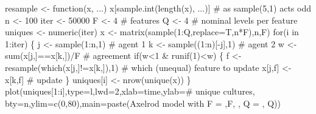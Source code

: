 \documentclass[
  a4paper,
  DIV=11,
  numbers=noendperiod]{scrreprt}
\newenvironment{Shaded}{\begin{snugshade}}{\end{snugshade}}
\newcommand{\AttributeTok}[1]{\textcolor[rgb]{0.40,0.45,0.13}{#1}}
\newcommand{\CommentTok}[1]{\textcolor[rgb]{0.37,0.37,0.37}{#1}}
\newcommand{\ControlFlowTok}[1]{\textcolor[rgb]{0.00,0.23,0.31}{#1}}
\newcommand{\DecValTok}[1]{\textcolor[rgb]{0.68,0.00,0.00}{#1}}
\newcommand{\FunctionTok}[1]{\textcolor[rgb]{0.28,0.35,0.67}{#1}}
\newcommand{\NormalTok}[1]{\textcolor[rgb]{0.00,0.23,0.31}{#1}}
\newcommand{\OtherTok}[1]{\textcolor[rgb]{0.00,0.23,0.31}{#1}}
\newcommand{\SpecialCharTok}[1]{\textcolor[rgb]{0.37,0.37,0.37}{#1}}
\newcommand{\StringTok}[1]{\textcolor[rgb]{0.13,0.47,0.30}{#1}}
\begin{document}
\begin{Shaded}
\begin{Highlighting}[]
\NormalTok{resample }\OtherTok{\textless{}{-}} \ControlFlowTok{function}\NormalTok{(x, ...) x[}\FunctionTok{sample.int}\NormalTok{(}\FunctionTok{length}\NormalTok{(x), ...)] }\CommentTok{\# as sample(5,1) acts odd}
\NormalTok{n }\OtherTok{\textless{}{-}} \DecValTok{100}
\NormalTok{iter }\OtherTok{\textless{}{-}} \DecValTok{50000}
\NormalTok{F }\OtherTok{\textless{}{-}} \DecValTok{4} \CommentTok{\# features}
\NormalTok{Q }\OtherTok{\textless{}{-}} \DecValTok{4} \CommentTok{\# nominal levels per feature}
\NormalTok{uniques }\OtherTok{\textless{}{-}} \FunctionTok{numeric}\NormalTok{(iter)}
\NormalTok{x }\OtherTok{\textless{}{-}} \FunctionTok{matrix}\NormalTok{(}\FunctionTok{sample}\NormalTok{(}\DecValTok{1}\SpecialCharTok{:}\NormalTok{Q,}\AttributeTok{replace=}\NormalTok{T,n}\SpecialCharTok{*}\NormalTok{F),n,F)}
\ControlFlowTok{for}\NormalTok{(i }\ControlFlowTok{in} \DecValTok{1}\SpecialCharTok{:}\NormalTok{iter)}
\NormalTok{\{}
\NormalTok{  j }\OtherTok{\textless{}{-}} \FunctionTok{sample}\NormalTok{(}\DecValTok{1}\SpecialCharTok{:}\NormalTok{n,}\DecValTok{1}\NormalTok{)       }\CommentTok{\# agent 1}
\NormalTok{  k }\OtherTok{\textless{}{-}} \FunctionTok{sample}\NormalTok{((}\DecValTok{1}\SpecialCharTok{:}\NormalTok{n)[}\SpecialCharTok{{-}}\NormalTok{j],}\DecValTok{1}\NormalTok{) }\CommentTok{\# agent 2}
\NormalTok{  w }\OtherTok{\textless{}{-}} \FunctionTok{sum}\NormalTok{(x[j,]}\SpecialCharTok{==}\NormalTok{x[k,])}\SpecialCharTok{/}\NormalTok{F }\CommentTok{\# agreement}
  \ControlFlowTok{if}\NormalTok{(w}\SpecialCharTok{\textless{}}\DecValTok{1} \SpecialCharTok{\&} \FunctionTok{runif}\NormalTok{(}\DecValTok{1}\NormalTok{)}\SpecialCharTok{\textless{}}\NormalTok{w) \{}
\NormalTok{    f }\OtherTok{\textless{}{-}} \FunctionTok{resample}\NormalTok{(}\FunctionTok{which}\NormalTok{(x[j,]}\SpecialCharTok{!=}\NormalTok{x[k,]),}\DecValTok{1}\NormalTok{) }\CommentTok{\# which (unequal) feature to update}
\NormalTok{    x[j,f] }\OtherTok{\textless{}{-}}\NormalTok{ x[k,f] }\CommentTok{\# update}
\NormalTok{    \}}
\NormalTok{  uniques[i] }\OtherTok{\textless{}{-}} \FunctionTok{nrow}\NormalTok{(}\FunctionTok{unique}\NormalTok{(x))}
\NormalTok{\}}
\FunctionTok{plot}\NormalTok{(uniques[}\DecValTok{1}\SpecialCharTok{:}\NormalTok{i],}\AttributeTok{type=}\StringTok{\textquotesingle{}l\textquotesingle{}}\NormalTok{,}\AttributeTok{lwd=}\DecValTok{2}\NormalTok{,}\AttributeTok{xlab=}\StringTok{\textquotesingle{}time\textquotesingle{}}\NormalTok{,}\AttributeTok{ylab=}\StringTok{\textquotesingle{}\# unique cultures\textquotesingle{}}\NormalTok{,}
     \AttributeTok{bty=}\StringTok{\textquotesingle{}n\textquotesingle{}}\NormalTok{,}\AttributeTok{ylim=}\FunctionTok{c}\NormalTok{(}\DecValTok{0}\NormalTok{,}\DecValTok{80}\NormalTok{),}\AttributeTok{main=}\FunctionTok{paste}\NormalTok{(}\StringTok{\textquotesingle{}Axelrod model with F = \textquotesingle{}}\NormalTok{,F, }\StringTok{\textquotesingle{}, Q = \textquotesingle{}}\NormalTok{, Q))}
\end{Highlighting}
\end{Shaded}
\end{document}
